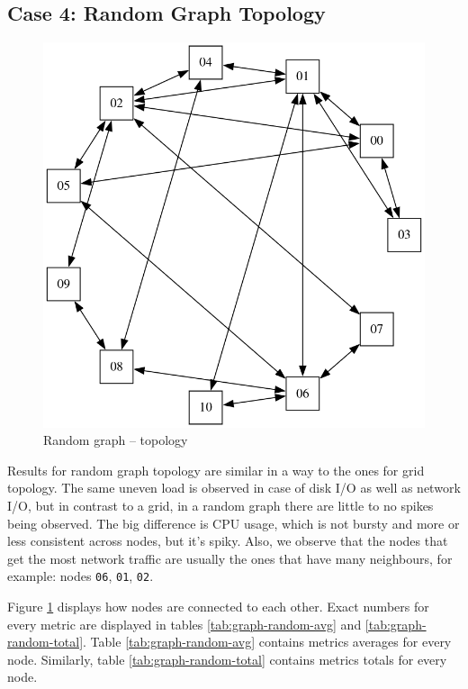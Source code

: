 



\newpage
\subsection{Case 4: Random Graph Topology}

\begin{figure}
\centering
\captionsetup{justification=centering,width=0.8\linewidth}
\includegraphics[width=0.7\linewidth]{figures/topologies/graph-random.png}
\caption{Random graph -- topology}
\label{fig:graph-random-topology}
\end{figure}

Results for random graph topology are similar in a way to the ones for grid
topology. The same uneven load is observed in case of disk I/O as well as
network I/O, but in contrast to a grid, in a random graph there are little to
no spikes being observed. The big difference is CPU usage, which is not bursty
and more or less consistent across nodes, but it's spiky. Also, we observe that
the nodes that get the most network traffic are usually the ones that have many
neighbours, for example: nodes \verb|06|, \verb|01|, \verb|02|.

Figure \ref{fig:graph-random-topology} displays how nodes are connected to each
other. Exact numbers for every metric are displayed in tables
\ref{tab:graph-random-avg} and \ref{tab:graph-random-total}. Table
\ref{tab:graph-random-avg} contains metrics averages for every node. Similarly,
table \ref{tab:graph-random-total} contains metrics totals for every node.

